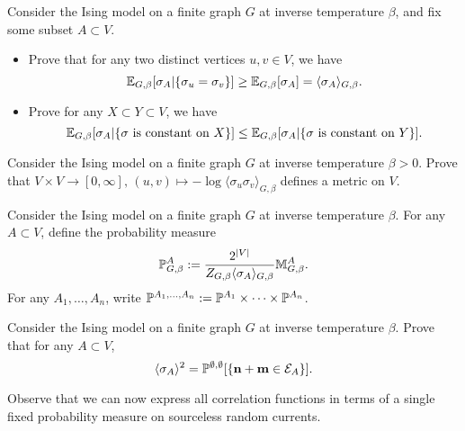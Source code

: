 \begin{exercise}
    Consider the Ising model on a finite graph $G$
    at inverse temperature $\beta$, and fix some subset $A\subset V$.
    \begin{itemize}
        \item     Prove that for any two distinct vertices $u,v\in V$,
        we have
        \[
            \E_{G,\beta}[\sigma_A|\{\sigma_u=\sigma_v\}]
            \geq
            \E_{G,\beta}[\sigma_A]=\langle\sigma_A\rangle_{G,\beta}.
        \]
        \item Prove for any $X\subset Y\subset V$, we have
        \[
            \E_{G,\beta}[\sigma_A|\{\text{$\sigma$ is constant on $X$}\}]
            \leq
            \E_{G,\beta}[\sigma_A|\{\text{$\sigma$ is constant on $Y$}\}]
            .
        \]
    \end{itemize}
\end{exercise}

\begin{exercise}
    Consider the Ising model on a finite graph $G$
    at inverse temperature $\beta>0$.
    Prove that $V\times V\to [0,\infty],\,
    (u,v)\mapsto-\log\langle\sigma_u\sigma_v\rangle_{G,\beta}$
    defines a metric on $V$.
\end{exercise}

\begin{definition}
    Consider the Ising model on a finite graph $G$
    at inverse temperature $\beta$.
    For any $A\subset V$,
    define the probability measure
    \[
        \P^A_{G,\beta}:=\frac{2^{|V|}}{Z_{G,\beta}\langle\sigma_A\rangle_{G,\beta}}\M^A_{G,\beta}.
    \]
    For any $A_1,\ldots,A_n$,
    write $\P^{A_1,\ldots,A_n}:=\P^{A_1}\times\cdots\times\P^{A_n}$.
\end{definition}

\begin{exercise}
    Consider the Ising model on a finite graph $G$
    at inverse temperature $\beta$.
    Prove that for any $A\subset V$,
    \[
        \langle\sigma_A\rangle^2
        =
        \P^{\emptyset,\emptyset}[\{\n+\m\in\calE_A\}].
    \]

    Observe that we can now express all correlation functions in terms of a single
    fixed probability measure on sourceless random currents.
\end{exercise}

